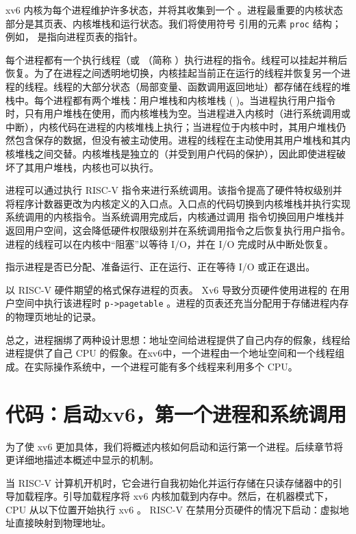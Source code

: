 xv6 内核为每个进程维护许多状态，并将其收集到一个
        。进程最重要的内核状态部分是其页表、内核堆栈和运行状态。我们将使用符号
        引用的元素
    \lstinline{proc}   结构；例如，
        是指向进程页表的指针。  

每个进程都有一个执行线程（或
       （简称      ）执行进程的指令。线程可以挂起并稍后恢复。为了在进程之间透明地切换，内核挂起当前正在运行的线程并恢复另一个进程的线程。线程的大部分状态（局部变量、函数调用返回地址）都存储在线程的堆栈中。每个进程都有两个堆栈：用户堆栈和内核堆栈 (        )。当进程执行用户指令时，只有用户堆栈在使用，而内核堆栈为空。当进程进入内核时（进行系统调用或中断），内核代码在进程的内核堆栈上执行；当进程位于内核中时，其用户堆栈仍然包含保存的数据，但没有被主动使用。进程的线程在主动使用其用户堆栈和其内核堆栈之间交替。内核堆栈是独立的（并受到用户代码的保护），因此即使进程破坏了其用户堆栈，内核也可以执行。  

进程可以通过执行 RISC-V        指令来进行系统调用。该指令提高了硬件特权级别并将程序计数器更改为内核定义的入口点。入口点的代码切换到内核堆栈并执行实现系统调用的内核指令。当系统调用完成后，内核通过调用      指令切换回用户堆栈并返回用户空间，这会降低硬件权限级别并在系统调用指令之后恢复执行用户指令。进程的线程可以在内核中“阻塞”以等待 I/O，并在 I/O 完成时从中断处恢复。  

       指示进程是否已分配、准备运行、正在运行、正在等待 I/O 或正在退出。  

       以 RISC-V 硬件期望的格式保存进程的页表。 Xv6 导致分页硬件使用进程的
 在用户空间中执行该进程时    \lstinline{p->pagetable}   。进程的页表还充当分配用于存储进程内存的物理页地址的记录。  

总之，进程捆绑了两种设计思想：地址空间给进程提供了自己内存的假象，线程给进程提供了自己 CPU 的假象。在xv6中，一个进程由一个地址空间和一个线程组成。在实际操作系统中，一个进程可能有多个线程来利用多个 CPU。
    \section{代码：启动xv6，第一个进程和系统调用  }    为了使 xv6 更加具体，我们将概述内核如何启动和运行第一个进程。后续章节将更详细地描述本概述中显示的机制。  

当 RISC-V 计算机开机时，它会进行自我初始化并运行存储在只读存储器中的引导加载程序。引导加载程序将 xv6 内核加载到内存中。然后，在机器模式下，CPU 从以下位置开始执行 xv6
        。 RISC-V 在禁用分页硬件的情况下启动：虚拟地址直接映射到物理地址。  

